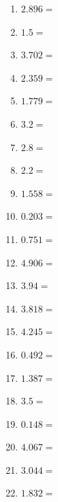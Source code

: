 \documentclass[12pt]{article}
\begin{document}
\begin{enumerate}
\item \large $ 2.896 = $ \vspace{1.5cm}
\item \large $ 1.5 = $ \vspace{1.5cm}
\item \large $ 3.702 = $ \vspace{1.5cm}
\item \large $ 2.359 = $ \vspace{1.5cm}
\newpage
\item \large $ 1.779 = $ \vspace{1.5cm}
\item \large $ 3.2 = $ \vspace{1.5cm}
\item \large $ 2.8 = $ \vspace{1.5cm}
\item \large $ 2.2 = $ \vspace{1.5cm}
\item \large $ 1.558 = $ \vspace{1.5cm}
\item \large $ 0.203 = $ \vspace{1.5cm}
\item \large $ 0.751 = $ \vspace{1.5cm}
\item \large $ 4.906 = $ \vspace{1.5cm}
\item \large $ 3.94 = $ \vspace{1.5cm}
\item \large $ 3.818 = $ \vspace{1.5cm}
\newpage
\item \large $ 4.245 = $ \vspace{1.5cm}
\item \large $ 0.492 = $ \vspace{1.5cm}
\item \large $ 1.387 = $ \vspace{1.5cm}
\item \large $ 3.5 = $ \vspace{1.5cm}
\item \large $ 0.148 = $ \vspace{1.5cm}
\item \large $ 4.067 = $ \vspace{1.5cm}
\item \large $ 3.044 = $ \vspace{1.5cm}
\item \large $ 1.832 = $ \vspace{1.5cm}

\end{enumerate}
\end{document}
